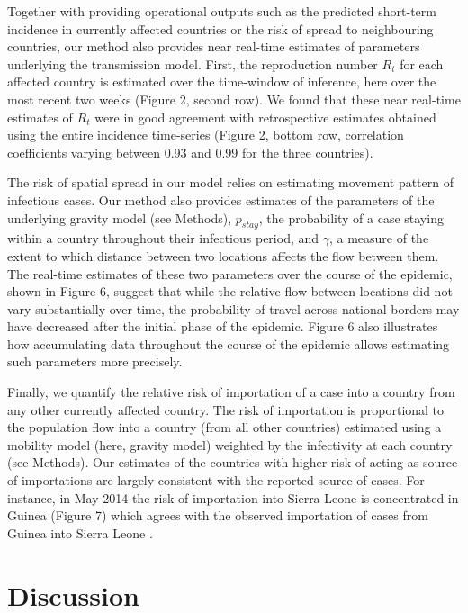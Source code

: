 \documentclass[9pt,twocolumn,twoside,lineno]{pnas-new}
\begin{document}
Together with providing operational outputs such as the predicted
short-term incidence in currently affected countries or the risk of
spread to neighbouring countries, our method also provides near
real-time estimates of parameters underlying the transmission model.
First, the reproduction number \(R_t\) for each affected country is
estimated over the time-window of inference, here over the most recent
two weeks (Figure 2, second row). We found that these near real-time
estimates of \(R_t\) were in good agreement with retrospective estimates
obtained using the entire incidence time-series (Figure 2, bottom row,
correlation coefficients varying between 0.93 and 0.99 for the three
countries).

The risk of spatial spread in our model relies on estimating movement
pattern of infectious cases. Our method also provides estimates of the
parameters of the underlying gravity model (see Methods), \(p_{stay}\),
the probability of a case staying within a country throughout their
infectious period, and \(\gamma\), a measure of the extent to which
distance between two locations affects the flow between them. The
real-time estimates of these two parameters over the course of the
epidemic, shown in Figure 6, suggest that while the relative flow
between locations did not vary substantially over time, the probability
of travel across national borders may have decreased after the initial
phase of the epidemic. Figure 6 also illustrates how accumulating data
throughout the course of the epidemic allows estimating such parameters
more precisely.

Finally, we quantify the relative risk of importation of a case into a
country from any other currently affected country. The risk of
importation is proportional to the population flow into a country (from
all other countries) estimated using a mobility model (here, gravity
model) weighted by the infectivity at each country (see Methods). Our
estimates of the countries with higher risk of acting as source of
importations are largely consistent with the reported source of cases.
For instance, in May 2014 the risk of importation into Sierra Leone is
concentrated in Guinea (Figure 7) which agrees with the observed
importation of cases from Guinea into Sierra Leone
\cite{gire2014genomic}.

% 

\section*{Discussion}\label{discussion}
\end{document}
